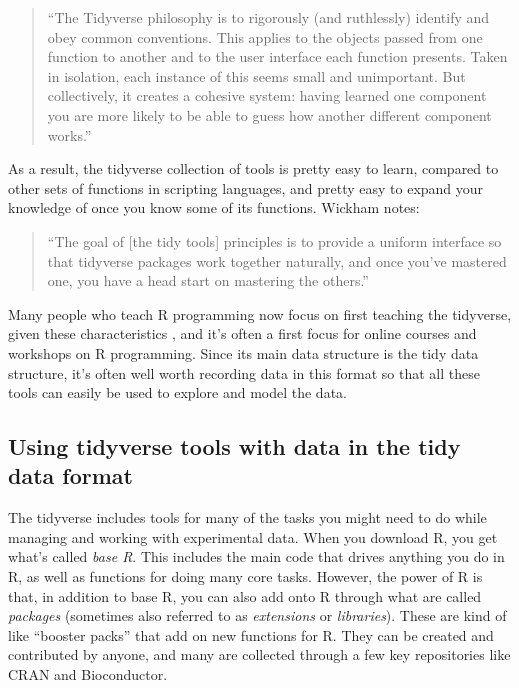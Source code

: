 \documentclass[]{tufte-book}
\begin{document}
\begin{quote}
``The Tidyverse
philosophy is to rigorously (and ruthlessly) identify and obey common
conventions. This applies to the objects passed from one function to another
and to the user interface each function presents. Taken in isolation, each
instance of this seems small and unimportant. But collectively, it creates
a cohesive system: having learned one component you are more likely to be
able to guess how another different component works.''
\citep{bryan2017data}
\end{quote}

As a result, the tidyverse collection of tools is pretty easy to learn, compared
to other sets of functions in scripting languages, and pretty easy to expand
your knowledge of once you know some of its functions. Wickham notes:

\begin{quote}
``The goal of {[}the tidy tools{]} principles is to provide a uniform interface so
that tidyverse packages work together naturally, and once you've mastered one,
you have a head start on mastering the others.'' \citep{wickhem2017tidy}
\end{quote}

Many people who teach
R programming now focus on first teaching the tidyverse, given these
characteristics \citep{robinson2017teach, peng2018teaching}, and it's often a
first focus for online courses and workshops on R programming. Since its main
data structure is the tidy data structure, it's often well worth recording
data in this format so that all these tools can easily be used to explore and
model the data.

\subsection{Using tidyverse tools with data in the tidy data format}\label{using-tidyverse-tools-with-data-in-the-tidy-data-format}

The tidyverse includes tools for many of the tasks you might need to
do while managing and working with experimental data. When you download
R, you get what's called \emph{base R}. This includes the main code that drives
anything you do in R, as well as functions for doing many core tasks.
However, the power of R is that, in addition to base R, you can also add
onto R through what are called \emph{packages} (sometimes also referred to
as \emph{extensions} or \emph{libraries}). These are kind of like ``booster packs''
that add on new functions for R. They can be created and contributed
by anyone, and many are collected through a few key repositories like
CRAN and Bioconductor.
\end{document}
